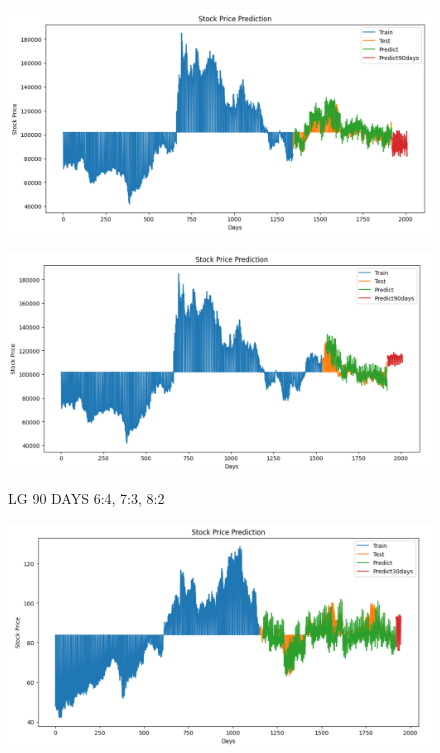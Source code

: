 \documentclass{article}
\begin{document}
\begin{multicols}{2}
\begin{figure}[H]
\begin{minipage}{0.15\textwidth}
    \label{fig:1}
    \end{minipage}%
    \begin{minipage}{0.15\textwidth}
    \centering
    \includegraphics[width=1\textwidth]{Image/N_Beat/N_BEAT_7_3_LG_90DAYS.png}
  
    \label{fig:2}
    \end{minipage}%
    \begin{minipage}{0.15\textwidth}
    \centering
    \includegraphics[width=1\textwidth]{Image/N_Beat/N_BEAT_8_2_LG_90DAYS.png}

    \label{fig:3}
    \end{minipage}
    \caption{LG 90 DAYS  6:4, 7:3, 8:2 }
\end{figure}


\begin{figure}[H]
    \centering
    \begin{minipage}{0.15\textwidth}
    \centering
    \includegraphics[width=1\textwidth]{Image/N_Beat/N_BEAT_6_4_SONY_30DAYS.png}
   

\end{minipage}
\end{figure}
\end{multicols}
\end{document}

